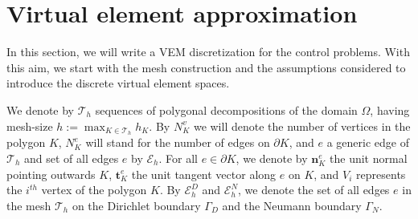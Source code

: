 \documentclass[smallextended]{svjour3}
\numberwithin{equation}{section}
\numberwithin{figure}{section}
\numberwithin{table}{section}
\newcommand\bV{\mathbf{V}}
\newcommand\bPi{\boldsymbol{\Pi}}
\newcommand{\tR}{\tilde{R}}
\newcommand\buu{\underline{\boldsymbol{u}}}
\newcommand\buz{\underline{\boldsymbol{z}}}
\newcommand\by{\boldsymbol{y}}
\newcommand\bu{\boldsymbol{u}}
\newcommand\bz{\boldsymbol{z}}
\newcommand{\bYd}{\boldsymbol{Y}_d}
\newcommand{\bY}{\boldsymbol{Y}}
\newcommand\cT{\mathcal{T}}
\newcommand{\bbV}{\mathbb{V}}
\begin{document}
%




	\section{Virtual element approximation} \label{sec:VEapprox}

    In this section, we will write a VEM discretization for the control problems. With this
aim, we start with the mesh construction and the assumptions considered to introduce
the discrete virtual element spaces.
	
	We denote by  ${\mathcal T}_h$ sequences of polygonal decompositions of the domain $\Omega$, having mesh-size $h:=\max_{K\in{\mathcal T}_h}h_K$.
	By $N^v_K$ we will denote the number of vertices in the polygon $K$, $N^e_K$
	will stand for the number of edges on $\partial K$, and $e$ a generic
	edge of $\mathcal{T}_h$ and set of all edges $e$ by $\mathcal{E}_h$. For all $e\in \partial K$, we denote by $\boldsymbol{n}_K^e$
	the unit normal pointing outwards $K$, $\boldsymbol{t}^e_K$ the unit tangent vector along $e$
	on $K$, and $V_i$ represents the $i^{th}$ vertex of the polygon $K$. By $\mathcal{E}_h^D$ and $\mathcal{E}_h^N$, we denote the set of all edges $e$ in the mesh $\cT_h$ on the Dirichlet boundary $\Gamma_D$ and the Neumann boundary $\Gamma_N$. 
	
\end{document}
